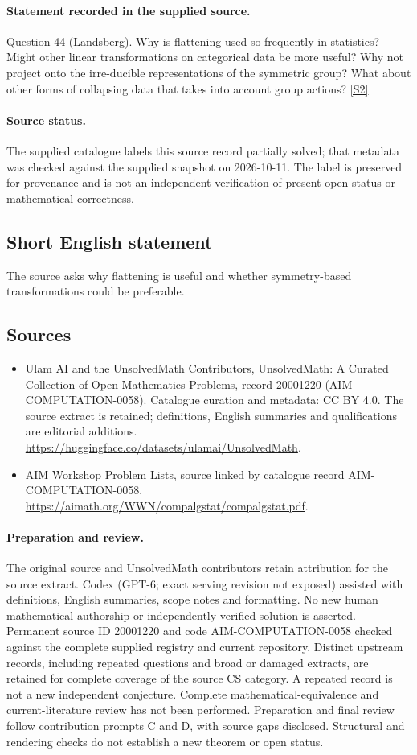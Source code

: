 \documentclass[11pt]{article}
\begin{document}
\paragraph{Statement recorded in the supplied source.}
Question 44 (Landsberg). Why is flattening used so frequently in statistics? Might other linear transformations on categorical data be more useful? Why not project onto the irre-ducible representations of the symmetric group? What about other forms of collapsing data that takes into account group actions? \href{https://aimath.org/WWN/compalgstat/compalgstat.pdf}{[S2]}
\paragraph{Source status.}
The supplied catalogue labels this source record partially solved; that metadata was checked against the supplied snapshot on 2026-10-11. The label is preserved for provenance and is not an independent verification of present open status or mathematical correctness.
\subsection{Short English statement}
The source asks why flattening is useful and whether symmetry-based transformations could be preferable.
\subsection{Sources}
\begin{itemize}
\item[S1] Ulam AI and the UnsolvedMath Contributors, UnsolvedMath: A Curated Collection of Open Mathematics Problems, record 20001220 (AIM-COMPUTATION-0058). Catalogue curation and metadata: CC BY 4.0. The source extract is retained; definitions, English summaries and qualifications are editorial additions.
\url{https://huggingface.co/datasets/ulamai/UnsolvedMath}.
\item[S2] AIM Workshop Problem Lists, source linked by catalogue record AIM-COMPUTATION-0058.
\url{https://aimath.org/WWN/compalgstat/compalgstat.pdf}.
\end{itemize}
\paragraph{Preparation and review.}
The original source and UnsolvedMath contributors retain attribution for the source extract. Codex (GPT-6; exact serving revision not exposed) assisted with definitions, English summaries, scope notes and formatting. No new human mathematical authorship or independently verified solution is asserted. Permanent source ID 20001220 and code AIM-COMPUTATION-0058 checked against the complete supplied registry and current repository. Distinct upstream records, including repeated questions and broad or damaged extracts, are retained for complete coverage of the source CS category. A repeated record is not a new independent conjecture. Complete mathematical-equivalence and current-literature review has not been performed. Preparation and final review follow contribution prompts C and D, with source gaps disclosed. Structural and rendering checks do not establish a new theorem or open status.
\label{end:20001220}
\end{document}
